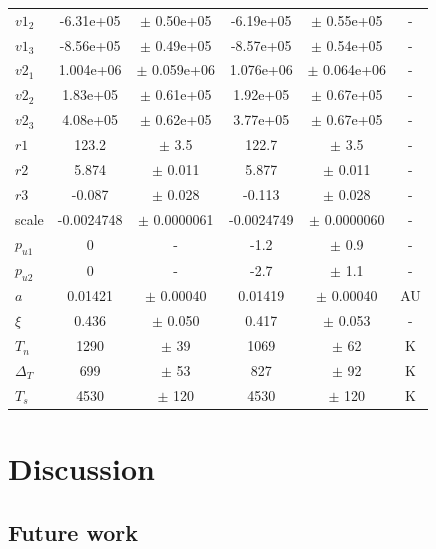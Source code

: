\documentclass[a4paper,fleqn,usenatbib]{mnras}
\begin{document}
\begin{center}
\begin{table}
{\begin{center}
\begin{tabular}{l c c c c c}
$v1_2$ &    -6.31e+05 & $\pm$        0.50e+05 &    -6.19e+05 & $\pm$        0.55e+05 & -\\
$v1_3$ &    -8.56e+05 & $\pm$        0.49e+05 &    -8.57e+05 & $\pm$        0.54e+05 & -\\
$v2_1$ &    1.004e+06 & $\pm$       0.059e+06 &    1.076e+06 & $\pm$       0.064e+06 & -\\
$v2_2$ &     1.83e+05 & $\pm$        0.61e+05 &     1.92e+05 & $\pm$        0.67e+05 & -\\
$v2_3$ &     4.08e+05 & $\pm$        0.62e+05 &     3.77e+05 & $\pm$        0.67e+05 & -\\
$r1$ &        123.2 & $\pm$         3.5 &        122.7 & $\pm$         3.5 & -\\
$r2$ &        5.874 & $\pm$       0.011 &        5.877 & $\pm$       0.011 & -\\
$r3$ &       -0.087 & $\pm$       0.028 &       -0.113 & $\pm$       0.028 & -\\
scale &   -0.0024748 & $\pm$   0.0000061 &   -0.0024749 & $\pm$   0.0000060 & -\\
$p_{u1}$ & 0 & - &         -1.2 & $\pm$         0.9 & -\\
$p_{u2}$ & 0 & - &         -2.7 & $\pm$         1.1 & -\\
$a$ &      0.01421 & $\pm$     0.00040 &      0.01419 & $\pm$     0.00040 & AU\\
$\xi$ &        0.436 & $\pm$       0.050 &        0.417 & $\pm$       0.053 & -\\
$T_n$ &         1290 & $\pm$          39 &         1069 & $\pm$          62 & K\\
$\Delta_T$ &          699 & $\pm$          53 &          827 & $\pm$          92 & K\\
$T_s$ &         4530 & $\pm$         120 &         4530 & $\pm$         120 & K\\
\end{tabular}
\end{center}
\label{tab:results}
}
\end{table}
\end{center}

\section{Discussion}\label{sec:Discussion}

\subsection{Future work}\label{sec:future work}
\end{document}
